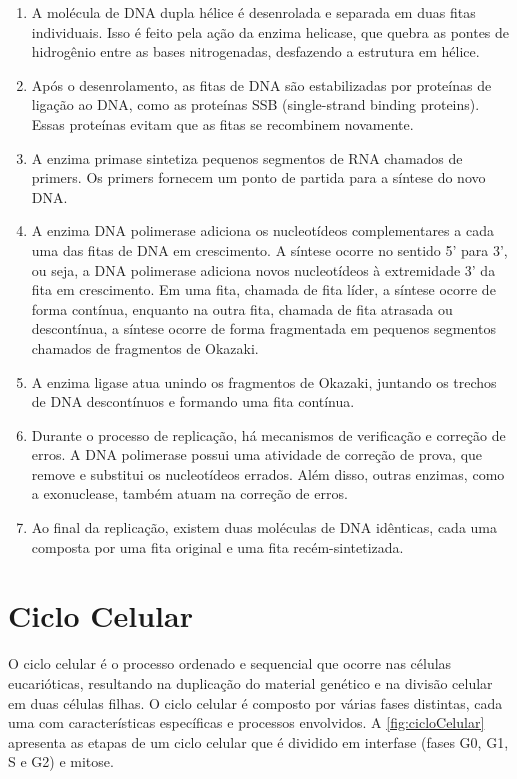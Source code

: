 \documentclass[11pt,a4paper]{article}
\begin{document}
	\begin{enumerate}
		\item A molécula de DNA dupla hélice é desenrolada e separada em duas fitas individuais. Isso é feito pela ação da enzima helicase, que quebra as pontes de hidrogênio entre as bases nitrogenadas, desfazendo a estrutura em hélice.
		\item Após o desenrolamento, as fitas de DNA são estabilizadas por proteínas de ligação ao DNA, como as proteínas SSB (single-strand binding proteins). Essas proteínas evitam que as fitas se recombinem novamente.
		\item A enzima primase sintetiza pequenos segmentos de RNA chamados de primers. Os primers fornecem um ponto de partida para a síntese do novo DNA.
		\item A enzima DNA polimerase adiciona os nucleotídeos complementares a cada uma das fitas de DNA em crescimento. A síntese ocorre no sentido 5' para 3', ou seja, a DNA polimerase adiciona novos nucleotídeos à extremidade 3' da fita em crescimento. Em uma fita, chamada de fita líder, a síntese ocorre de forma contínua, enquanto na outra fita, chamada de fita atrasada ou descontínua, a síntese ocorre de forma fragmentada em pequenos segmentos chamados de fragmentos de Okazaki.
		\item A enzima ligase atua unindo os fragmentos de Okazaki, juntando os trechos de DNA descontínuos e formando uma fita contínua.
		\item Durante o processo de replicação, há mecanismos de verificação e correção de erros. A DNA polimerase possui uma atividade de correção de prova, que remove e substitui os nucleotídeos errados. Além disso, outras enzimas, como a exonuclease, também atuam na correção de erros.
		\item Ao final da replicação, existem duas moléculas de DNA idênticas, cada uma composta por uma fita original e uma fita recém-sintetizada.
	\end{enumerate}

	\section{Ciclo Celular}

	O ciclo celular é o processo ordenado e sequencial que ocorre nas células eucarióticas, resultando na duplicação do material genético e na divisão celular em duas células filhas. O ciclo celular é composto por várias fases distintas, cada uma com características específicas e processos envolvidos. A \ref{fig:cicloCelular} apresenta as etapas de um ciclo celular que é dividido em interfase (fases G0, G1, S e G2) e mitose.
\end{document}
